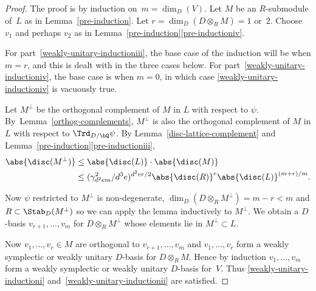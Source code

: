 \begin{proof}
The proof is by induction on~$m = \dim_D(V)$.
Let $M$ be an $R$-submodule of~$L$ as in Lemma~\ref{pre-induction}.
Let $r = \dim_D(D \otimes_R M) = 1$ or~$2$.
Choose $v_1$ and perhaps $v_2$ as in Lemma~\ref{pre-induction}\eqref{pre-inductioniv}.

For part~\eqref{weakly-unitary-inductioniii}, the base case of the induction will be when $m=r$, and this is dealt with in the three cases below.
For part~\eqref{weakly-unitary-inductioniv}, the base case is when $m=0$, in which case \eqref{weakly-unitary-inductioniv} is vacuously true.

Let $M^\perp$ be the orthogonal complement of $M$ in $L$ with respect to $\psi$.
By~Lem\-ma~\ref{orthog-complements}, $M^\perp$ is also the orthogonal complement of $M$ in $L$ with respect to $\Trd_{D/\bQ} \psi$.
By Lemma~\ref{disc-lattice-complement} and Lemma~\ref{pre-induction}\eqref{pre-inductioniii},\vspace*{-3pt}\enlargethispage{.5\baselineskip}
\begin{equation} \label{eqn:disc-Mperp}
\begin{split}
\abs{\disc(M^\perp)} &\leq \abs{\disc(L)} \cdot \abs{\disc(M)}\\
&\leq (\gamma_{d^2em}^2/d^3e)^{d^2er/2} \abs{\disc(R)}^r \abs{\disc(L)}^{(m+r)/m}.
\end{split}
\end{equation}

Now $\psi$ restricted to $M^\perp$ is non-degenerate, $\dim_D(D \otimes_R M^\perp) = m-r < m$ and $R \subset \Stab_D(M^\perp)$ so we can apply the lemma inductively to $M^\perp$.
We obtain a $D$-basis $v_{r+1}, \dotsc, v_m$ for $D \otimes_R M^\perp$ whose elements lie in $M^\perp \subset L$.

Now $v_1, \dotsc, v_r \in M$ are orthogonal to $v_{r+1}, \dotsc, v_m$ and $v_1, \dotsc, v_r$ form a weakly symplectic or weakly unitary $D$-basis for $D \otimes_R M$.
Hence by induction $v_1, \dotsc, v_m$ form a weakly symplectic or weakly unitary $D$-basis for~$V$.
Thus \eqref{weakly-unitary-inductioni} and~\eqref{weakly-unitary-inductionii} are satisfied.


\end{proof}
